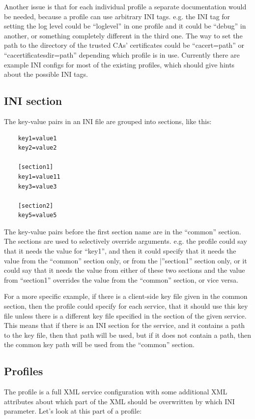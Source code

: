 \documentclass{article}
\begin{document}
Another issue is that for each individual profile a separate documentation would be needed, because a profile can use arbitrary INI tags. e.g. the INI tag for setting the log level could be “loglevel” in one profile and it could be “debug” in another, or something completely different in the third one. The way to set the path to the directory of the trusted CAs' certificates could be “cacert=path” or “cacertificatesdir=path” depending which profile is in use. Currently there are example INI configs for most of the existing profiles, which should give hints about the possible INI tags.

\subsection{INI section}

The key-value pairs in an INI file are grouped into sections, like this:

\begin{verbatim}
	key1=value1
	key2=value2

	[section1]
	key1=value11
	key3=value3

	[section2]
	key5=value5
\end{verbatim}

The key-value pairs before the first section name are in the “common” section. The sections are used to selectively override arguments. e.g. the profile could say that it needs the value for “key1”, and then it could specify that it needs the value from the “common” section only, or from the |”section1” section only, or it could say that it needs the value from either of these two sections and the value from “section1” overrides the value from the “common” section, or vice versa.

For a more specific example, if there is a client-side key file given in the common section, then the profile could specify for each service, that it should use this key file unless there is a different key file specified in the section of the given service. This means that if there is an INI section for the service, and it contains a path to the key file, then that path will be used, but if it does not contain a path, then the common key path will be used from the “common” section.

\subsection{Profiles}

The profile is a full XML service configuration with some additional XML attributes about which part of the XML should be overwritten by which INI parameter. Let's look at this part of a profile:
\end{document}
